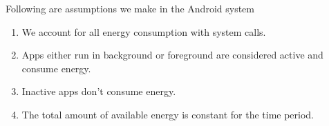 Following are assumptions we make in the Android system
\begin{enumerate}

\item  We account for all energy consumption with system calls.
\item  Apps either run in background or foreground are considered active and consume energy.
\item  Inactive apps don't consume energy.
\item  The total amount of available energy is constant for the time period.

\end{enumerate}




















